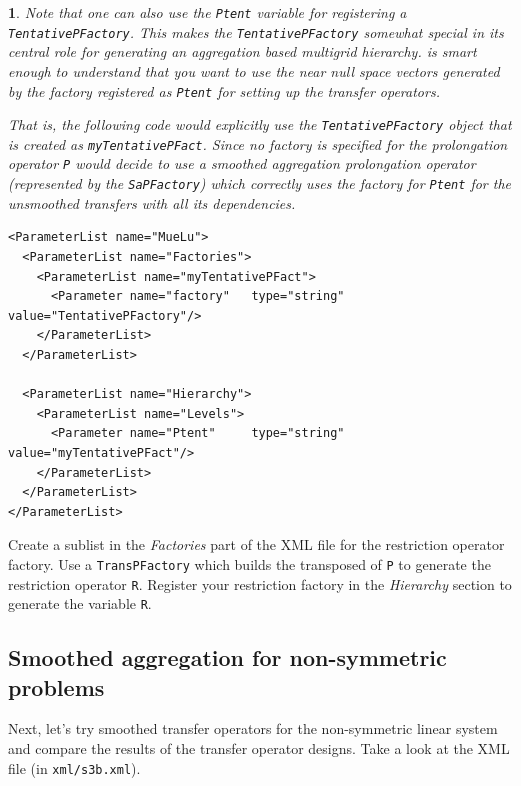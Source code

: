 \documentclass[10pt,fleqn]{book}
\newtheorem*{mycomment}{\ding{42}}
\begin{document}
\begin{mycomment}
Note that one can also use the \verb|Ptent| variable for registering a \verb|TentativePFactory|. This makes the \verb|TentativePFactory| somewhat special in its central role for generating an aggregation based multigrid hierarchy. \muelu is smart enough to understand that you want to use the near null space vectors generated by the factory registered as \verb|Ptent| for setting up the transfer operators.

That is, the following code would explicitly use the \verb|TentativePFactory| object that is created as \verb|myTentativePFact|. Since no factory is specified for the prolongation operator \verb|P| \muelu would decide to use a smoothed aggregation prolongation operator (represented by the \verb|SaPFactory|) which correctly uses the factory for \verb|Ptent| for the unsmoothed transfers with all its dependencies.
\begin{lstlisting}
<ParameterList name="MueLu">
  <ParameterList name="Factories">
    <ParameterList name="myTentativePFact">
      <Parameter name="factory"   type="string" value="TentativePFactory"/>
    </ParameterList>
  </ParameterList>

  <ParameterList name="Hierarchy">
    <ParameterList name="Levels">
      <Parameter name="Ptent"     type="string" value="myTentativePFact"/>
    </ParameterList>
  </ParameterList>
</ParameterList>
\end{lstlisting}

\end{mycomment}

\begin{exercise}
  Create a sublist in the \textit{Factories} part of the XML file for the restriction operator factory. Use a \verb|TransPFactory| which builds the transposed of \verb|P| to generate the restriction operator \verb|R|. Register your restriction factory in the \textit{Hierarchy} section to generate the variable \verb|R|.
\end{exercise}

\subsection{Smoothed aggregation for non-symmetric problems}

Next, let's try smoothed transfer operators for the non-symmetric linear system and compare the results of the transfer operator designs. Take a look at the XML file (in \texttt{xml/s3b.xml}).
\end{document}
